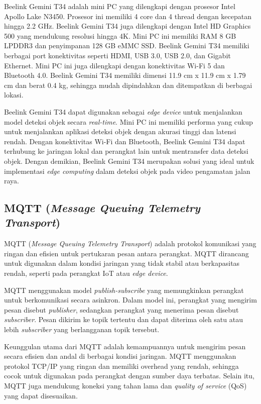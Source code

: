 Beelink Gemini T34 adalah mini PC yang dilengkapi dengan prosesor Intel Apollo Lake N3450. Prosesor ini memiliki 4 core dan 4 thread dengan kecepatan hingga 2.2 GHz. Beelink Gemini T34 juga dilengkapi dengan Intel HD Graphics 500 yang mendukung resolusi hingga 4K. Mini PC ini memiliki RAM 8 GB LPDDR3 dan penyimpanan 128 GB eMMC SSD. Beelink Gemini T34 memiliki berbagai port konektivitas seperti HDMI, USB 3.0, USB 2.0, dan Gigabit Ethernet. Mini PC ini juga dilengkapi dengan konektivitas Wi-Fi 5 dan Bluetooth 4.0. Beelink Gemini T34 memiliki dimensi 11.9 cm x 11.9 cm x 1.79 cm dan berat 0.4 kg, sehingga mudah dipindahkan dan ditempatkan di berbagai lokasi. \parencite*{beelinkGeminiT34}

Beelink Gemini T34 dapat digunakan sebagai \emph{edge device} untuk menjalankan model deteksi objek secara \emph{real-time}. Mini PC ini memiliki performa yang cukup untuk menjalankan aplikasi deteksi objek dengan akurasi tinggi dan latensi rendah. Dengan konektivitas Wi-Fi dan Bluetooth, Beelink Gemini T34 dapat terhubung ke jaringan lokal dan perangkat lain untuk mentransfer data deteksi objek. Dengan demikian, Beelink Gemini T34 merupakan solusi yang ideal untuk implementasi \emph{edge computing} dalam deteksi objek pada video pengamatan jalan raya.

\subsection{MQTT (\emph{Message Queuing Telemetry Transport})}

MQTT (\emph{Message Queuing Telemetry Transport}) adalah protokol komunikasi yang ringan dan efisien untuk pertukaran pesan antara perangkat. MQTT dirancang untuk digunakan dalam kondisi jaringan yang tidak stabil atau berkapasitas rendah, seperti pada perangkat IoT atau \emph{edge device}.

MQTT menggunakan model \emph{publish-subscribe} yang memungkinkan perangkat untuk berkomunikasi secara asinkron. Dalam model ini, perangkat yang mengirim pesan disebut \emph{publisher}, sedangkan perangkat yang menerima pesan disebut \emph{subscriber}. Pesan dikirim ke topik tertentu dan dapat diterima oleh satu atau lebih \emph{subscriber} yang berlangganan topik tersebut.

Keunggulan utama dari MQTT adalah kemampuannya untuk mengirim pesan secara efisien dan andal di berbagai kondisi jaringan. MQTT menggunakan protokol TCP/IP yang ringan dan memiliki overhead yang rendah, sehingga cocok untuk digunakan pada perangkat dengan sumber daya terbatas. Selain itu, MQTT juga mendukung koneksi yang tahan lama dan \emph{quality of service} (QoS) yang dapat disesuaikan.

